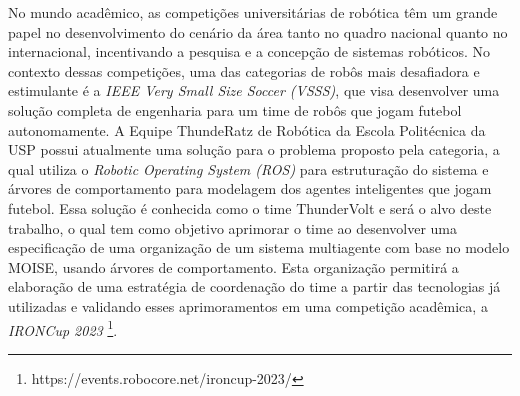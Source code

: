 No mundo acadêmico, as competições universitárias de robótica têm um grande papel no desenvolvimento do cenário da área tanto no quadro nacional quanto no internacional, incentivando a pesquisa e a concepção de sistemas robóticos. No contexto dessas competições, uma das categorias de robôs mais desafiadora e estimulante é a \textit{IEEE Very Small Size Soccer (VSSS)}, que visa desenvolver uma solução completa de engenharia para um time de robôs que jogam futebol autonomamente. A Equipe ThundeRatz de Robótica da Escola Politécnica da USP possui atualmente uma solução para o problema proposto pela categoria, a qual utiliza o \textit{Robotic Operating System (ROS)} para estruturação do sistema e árvores de comportamento para modelagem dos agentes inteligentes que jogam futebol. Essa solução é conhecida como o time ThunderVolt e será o alvo deste trabalho, o qual tem como objetivo aprimorar o time ao desenvolver uma especificação de uma organização de um sistema multiagente com base no modelo MOISE, usando árvores de comportamento. Esta organização permitirá a elaboração de uma estratégia de coordenação do time a partir das tecnologias já utilizadas e validando esses aprimoramentos em uma competição acadêmica, a \textit{IRONCup 2023} \footnote{https://events.robocore.net/ironcup-2023/}.
